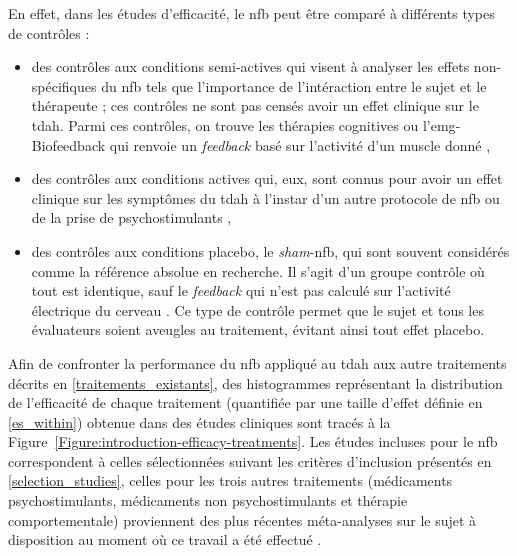 En effet, dans les études d'efficacité, le \gls{nfb} peut être comparé à différents types de contrôles \citep{Arns2014} :
\begin{itemize}
\item des contrôles aux conditions semi-actives qui visent à analyser les effets non-spécifiques du \gls{nfb} tels que l'importance de l'intéraction entre le sujet et le thérapeute ; 
ces contrôles ne sont pas censés avoir un effet clinique sur le \gls{tdah}. Parmi ces contrôles, on trouve les thérapies cognitives ou l'\gls{emg}-Biofeedback qui renvoie un \textit{feedback} basé
sur l'activité d'un muscle donné \citep{Bakhshayesh2011},
\item des contrôles aux conditions actives qui, eux, sont connus pour avoir un effet clinique sur les symptômes du \gls{tdah} à l'instar d'un autre protocole de \gls{nfb} \citep{Leins2007} ou
de la prise de psychostimulants \citep{Meisel2014},
\item des contrôles aux conditions placebo, le \textit{sham}-\gls{nfb}, qui sont souvent considérés comme la référence absolue en recherche. Il s'agit d'un groupe contrôle
où tout est identique, sauf le \textit{feedback} qui n'est pas calculé sur l'activité électrique du cerveau \citep{Arnold2013}. Ce type de contrôle permet 
que le sujet et tous les évaluateurs soient aveugles au traitement, évitant ainsi tout effet placebo.
\end{itemize}

Afin de confronter la performance du \gls{nfb} appliqué au \gls{tdah} aux autre traitements décrits en \ref{traitements_existants}, des histogrammes
représentant la distribution de l'efficacité de chaque traitement (quantifiée par une taille d'effet définie en \ref{es_within}) obtenue dans des études cliniques
sont tracés à la Figure~\ref{Figure:introduction-efficacy-treatments}.
Les études incluses pour le \gls{nfb} correspondent à celles sélectionnées suivant les critères d'inclusion présentés en \ref{selection_studies}, celles pour les
trois autres traitements (médicaments psychostimulants, médicaments non psychostimulants et thérapie comportementale) proviennent des plus récentes méta-analyses 
sur le sujet à disposition au moment où ce travail a été effectué \citep{Luan2017, Catala2017}.

